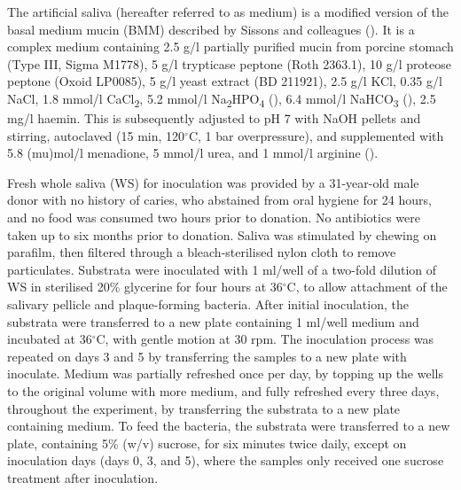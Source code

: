 \documentclass[
  b5paper,
]{book}
\begin{document}
The artificial saliva (hereafter referred to as medium) is a modified
version of the basal medium mucin (BMM) described by Sissons and
colleagues (). It is a
complex medium containing 2.5 g/l partially purified mucin from porcine
stomach (Type III, Sigma M1778), 5 g/l trypticase peptone (Roth 2363.1),
10 g/l proteose peptone (Oxoid LP0085), 5 g/l yeast extract (BD 211921),
2.5 g/l KCl, 0.35 g/l NaCl, 1.8 mmol/l CaCl\textsubscript{2}, 5.2 mmol/l
Na\textsubscript{2}HPO\textsubscript{4}
(),
6.4 mmol/l NaHCO\textsubscript{3}
(), 2.5 mg/l
haemin. This is subsequently adjusted to pH 7 with NaOH pellets and
stirring, autoclaved (15 min, 120\(^{\circ}\)C, 1 bar overpressure), and
supplemented with 5.8 (mu)mol/l menadione, 5 mmol/l urea, and 1 mmol/l
arginine ().

Fresh whole saliva (WS) for inoculation was provided by a 31-year-old
male donor with no history of caries, who abstained from oral hygiene
for 24 hours, and no food was consumed two hours prior to donation. No
antibiotics were taken up to six months prior to donation. Saliva was
stimulated by chewing on parafilm, then filtered through a
bleach-sterilised nylon cloth to remove particulates. Substrata were
inoculated with 1 ml/well of a two-fold dilution of WS in sterilised
20\% glycerine for four hours at 36\(^{\circ}\)C, to allow attachment of
the salivary pellicle and plaque-forming bacteria. After initial
inoculation, the substrata were transferred to a new plate containing 1
ml/well medium and incubated at 36\(^{\circ}\)C, with gentle motion at
30 rpm. The inoculation process was repeated on days 3 and 5 by
transferring the samples to a new plate with inoculate. Medium was
partially refreshed once per day, by topping up the wells to the
original volume with more medium, and fully refreshed every three days,
throughout the experiment, by transferring the substrata to a new plate
containing medium. To feed the bacteria, the substrata were transferred
to a new plate, containing 5\% (w/v) sucrose, for six minutes twice
daily, except on inoculation days (days 0, 3, and 5), where the samples
only received one sucrose treatment after inoculation.
\end{document}
